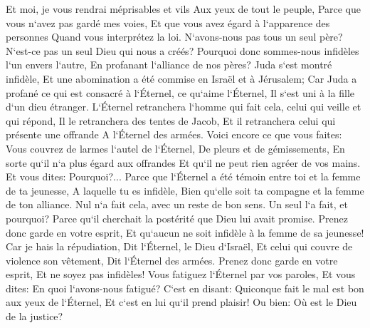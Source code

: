 \verse Et moi, je vous rendrai méprisables et vils Aux yeux de tout le peuple, Parce que vous n`avez pas gardé mes voies, Et que vous avez égard à l`apparence des personnes Quand vous interprétez la loi. 
\verse N`avons-nous pas tous un seul père? N`est-ce pas un seul Dieu qui nous a créés? Pourquoi donc sommes-nous infidèles l`un envers l`autre, En profanant l`alliance de nos pères? 
\verse Juda s`est montré infidèle, Et une abomination a été commise en Israël et à Jérusalem; Car Juda a profané ce qui est consacré à l`Éternel, ce qu`aime l`Éternel, Il s`est uni à la fille d`un dieu étranger. 
\verse L`Éternel retranchera l`homme qui fait cela, celui qui veille et qui répond, Il le retranchera des tentes de Jacob, Et il retranchera celui qui présente une offrande A l`Éternel des armées. 
\verse Voici encore ce que vous faites: Vous couvrez de larmes l`autel de l`Éternel, De pleurs et de gémissements, En sorte qu`il n`a plus égard aux offrandes Et qu`il ne peut rien agréer de vos mains. 
\verse Et vous dites: Pourquoi?... Parce que l`Éternel a été témoin entre toi et la femme de ta jeunesse, A laquelle tu es infidèle, Bien qu`elle soit ta compagne et la femme de ton alliance. 
\verse Nul n`a fait cela, avec un reste de bon sens. Un seul l`a fait, et pourquoi? Parce qu`il cherchait la postérité que Dieu lui avait promise. Prenez donc garde en votre esprit, Et qu`aucun ne soit infidèle à la femme de sa jeunesse! 
\verse Car je hais la répudiation, Dit l`Éternel, le Dieu d`Israël, Et celui qui couvre de violence son vêtement, Dit l`Éternel des armées. Prenez donc garde en votre esprit, Et ne soyez pas infidèles! 
\verse Vous fatiguez l`Éternel par vos paroles, Et vous dites: En quoi l`avons-nous fatigué? C`est en disant: Quiconque fait le mal est bon aux yeux de l`Éternel, Et c`est en lui qu`il prend plaisir! Ou bien: Où est le Dieu de la justice? 

